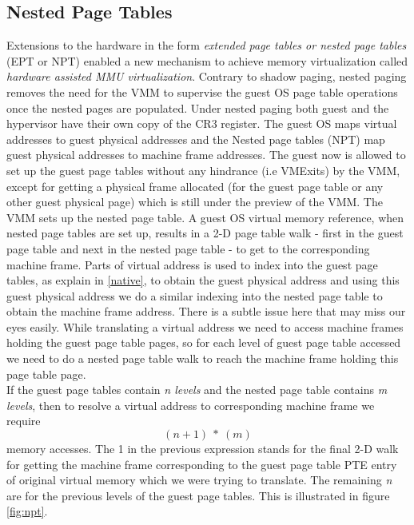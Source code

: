 \subsection{Nested Page Tables} \label{nested}
Extensions to the hardware in the form \textit{extended page tables or nested page tables} (EPT or NPT) enabled a new mechanism to achieve memory virtualization called \textit{hardware assisted MMU virtualization}. Contrary to shadow paging, nested paging removes the need for the VMM to supervise the guest OS page table operations once the nested pages are populated. Under nested paging both guest and the hypervisor have their own copy of the CR3 register. The guest OS maps virtual addresses to guest physical addresses and the Nested page tables (NPT) map guest physical addresses to machine frame addresses. The guest now is allowed to set up the guest page tables without any hindrance (i.e VMExits) by the VMM, except for getting a physical frame allocated (for the guest page table or any other guest physical page) which is still under the preview of the VMM. The VMM sets up the nested page table. A guest OS virtual memory reference, when nested page tables are set up, results in a 2-D page table walk - first in the guest page table and next in the nested page table - to get to the corresponding machine frame. Parts of virtual address is used to index into the guest page tables, as explain in \ref{native}, to obtain the guest physical address and using this guest physical address we do a similar indexing into the nested page table to obtain the machine frame address. There is a subtle issue here that may miss our eyes easily. While translating a virtual address we need to access machine frames holding the guest page table pages, so for each level of guest page table accessed we need to do a nested page table walk to reach the machine frame holding this page table page.\\
If the guest page tables contain \textit{n levels} and the nested page table contains \textit{m levels}, then to resolve a virtual address to corresponding machine frame we require \[(n+1)\ *\ (m)\] memory accesses. The 1 in the previous expression stands for the final 2-D walk for getting the machine frame corresponding to the guest page table PTE entry of original virtual memory which we were trying to translate. The remaining \textit{n} are for the previous levels of the guest page tables. This is illustrated in figure \ref{fig:npt}.\\

